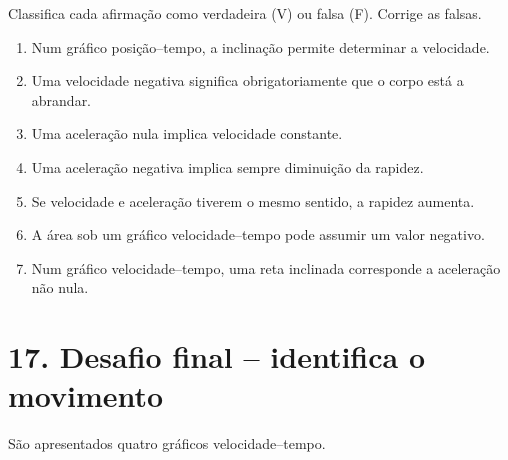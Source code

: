 \documentclass[11pt,a4paper]{article}
\newcommand{\resposta}[1][0.8]{
	\vspace{#1cm}
}
\begin{document}
	Classifica cada afirmação como verdadeira (V) ou falsa (F).
	Corrige as falsas.
	
	\begin{enumerate}[label=\textbf{\arabic*.},resume]
		
		\item[$\square$]
		Num gráfico posição--tempo, a inclinação permite determinar a velocidade.
		
		\resposta[0.4]
		
		\item[$\square$]
		Uma velocidade negativa significa obrigatoriamente que o corpo está a
		abrandar.
		
		\resposta[0.5]
		
		\item[$\square$]
		Uma aceleração nula implica velocidade constante.
		
		\resposta[0.5]
		
		\item[$\square$]
		Uma aceleração negativa implica sempre diminuição da rapidez.
		
		\resposta[0.5]
		
		\item[$\square$]
		Se velocidade e aceleração tiverem o mesmo sentido, a rapidez aumenta.
		
		\resposta[0.5]
		
		\item[$\square$]
		A área sob um gráfico velocidade--tempo pode assumir um valor negativo.
		
		\resposta[0.5]
		
		\item[$\square$]
		Num gráfico velocidade--tempo, uma reta inclinada corresponde a aceleração
		não nula.
		
		\resposta[0.5]
		
	\end{enumerate}
	
	\section{17. Desafio final -- identifica o movimento}
	
	São apresentados quatro gráficos velocidade--tempo.
	
\end{document}
